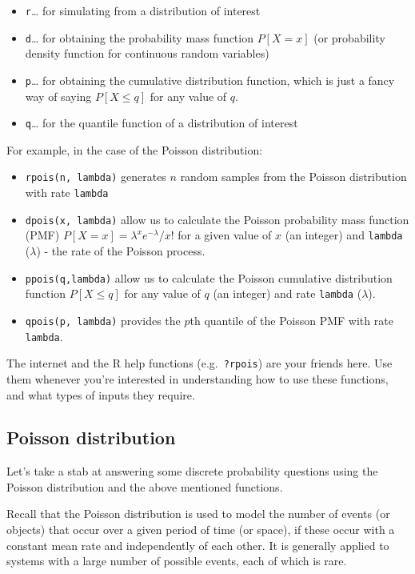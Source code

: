 \documentclass[
]{book}
\providecommand{\tightlist}{%
  \setlength{\itemsep}{0pt}\setlength{\parskip}{0pt}}
\begin{document}
\begin{itemize}
\tightlist
\item
  \texttt{r}\ldots{} for simulating from a distribution of interest
\item
  \texttt{d}\ldots{} for obtaining the probability mass function \(P[X=x]\) (or probability density function for continuous random variables)
\item
  \texttt{p}\ldots{} for obtaining the cumulative distribution function, which is just a fancy way of saying \(P[X \leq q]\) for any value of \(q\).
\item
  \texttt{q}\ldots{} for the quantile function of a distribution of interest
\end{itemize}

For example, in the case of the Poisson distribution:

\begin{itemize}
\tightlist
\item
  \texttt{rpois(n,\ lambda)} generates \(n\) random samples from the Poisson distribution with rate \texttt{lambda}
\item
  \texttt{dpois(x,\ lambda)} allow us to calculate the Poisson probability mass function (PMF) \(P[X=x] = \lambda^x e^{-\lambda}/x!\) for a given value of \(x\) (an integer) and \texttt{lambda} (\(\lambda\)) - the rate of the Poisson process.
\item
  \texttt{ppois(q,lambda)} allow us to calculate the Poisson cumulative distribution function \(P[X \leq q]\) for any value of \(q\) (an integer) and rate \texttt{lambda} (\(\lambda\)).
\item
  \texttt{qpois(p,\ lambda)} provides the \(p\)th quantile of the Poisson PMF with rate \texttt{lambda}.
\end{itemize}

The internet and the R help functions (e.g.~\texttt{?rpois}) are your friends here. Use them whenever you're interested in understanding how to use these functions, and what types of inputs they require.

\hypertarget{poisson-distribution}{%
\subsection{Poisson distribution}\label{poisson-distribution}}

Let's take a stab at answering some discrete probability questions using the Poisson distribution and the above mentioned functions.

Recall that the Poisson distribution is used to model the number of events (or objects) that occur over a given period of time (or space), if these occur with a constant mean rate and independently of each other. It is generally applied to systems with a large number of possible events, each of which is rare.
\end{document}
